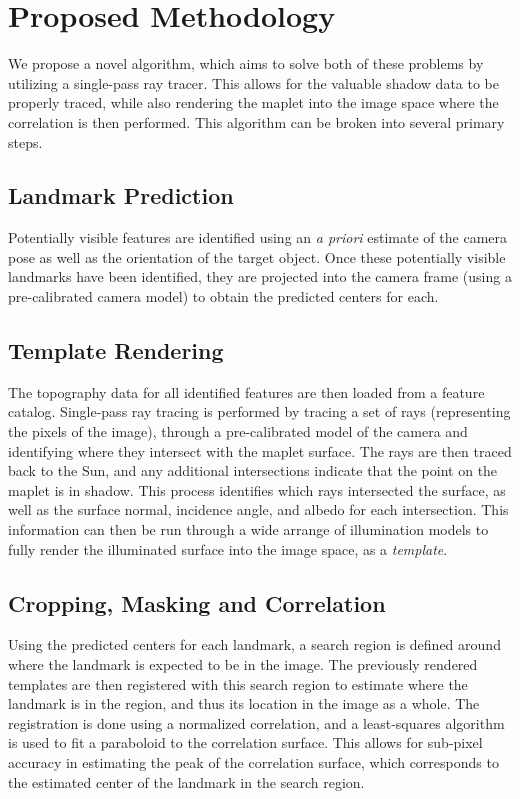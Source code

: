 \documentclass{src/RPI-SIW}
\begin{document}
\section*{Proposed Methodology}
We propose a novel algorithm, which aims to solve both of these problems by utilizing a single-pass ray tracer.  This allows for the valuable shadow data to be properly traced, while also rendering the maplet into the image space where the correlation is then performed.  This algorithm can be broken into several primary steps.

\subsection*{Landmark Prediction}
Potentially visible features are identified using an \textit{a priori} estimate of the camera pose as well as the orientation of the target object. Once these potentially visible landmarks have been identified, they are projected into the camera frame (using a pre-calibrated camera model) to obtain the predicted centers for each.  

\subsection*{Template Rendering}
The topography data for all identified features are then loaded from a feature catalog.  Single-pass ray tracing is performed by tracing a set of rays (representing the pixels of the image), through a pre-calibrated model of the camera and identifying where they intersect with the maplet surface.  The rays are then traced back to the Sun, and any additional intersections indicate that the point on the maplet is in shadow.  This process identifies which rays intersected the surface, as well as the surface normal, incidence angle, and albedo for each intersection.  This information can then be run through a wide arrange of illumination models to fully render the illuminated surface into the image space, as a \textit{template}.


\subsection*{Cropping, Masking and Correlation}
Using the predicted centers for each landmark, a search region is defined around where the landmark is expected to be in the image.  The previously rendered templates are then registered with this search region to estimate where the landmark is in the region, and thus its location in the image as a whole.  The registration is done using a normalized correlation, and a least-squares algorithm is used to fit a paraboloid to the correlation surface.  This allows for sub-pixel accuracy in estimating the peak of the correlation surface, which corresponds to the estimated center of the landmark in the search region.
\end{document}
